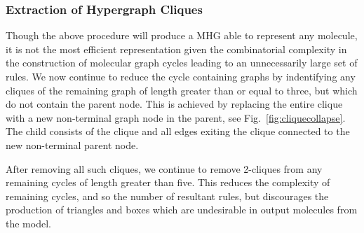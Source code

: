\documentclass{article}
\begin{document}

\subsubsection{Extraction of Hypergraph Cliques}\label{sec:cliques}
Though the above procedure will produce a MHG able to represent any molecule, it is not the most efficient representation given the combinatorial complexity in the construction of molecular graph cycles leading to an unnecessarily large set of rules. We now continue to reduce the cycle containing graphs by indentifying any cliques of the remaining graph of length greater than or equal to three, but which do not contain the parent node. This is achieved by replacing the entire clique with a new non-terminal graph node in the parent, see Fig.~\ref{fig:cliquecollapse}. The child consists of the clique and all edges exiting the clique connected to the new non-terminal parent node.

After removing all such cliques, we continue to remove 2-cliques from any remaining cycles of length greater than five. This reduces the complexity of remaining cycles, and so the number of resultant rules, but discourages the production of triangles and boxes which are undesirable in output molecules from the model.
\end{document}
